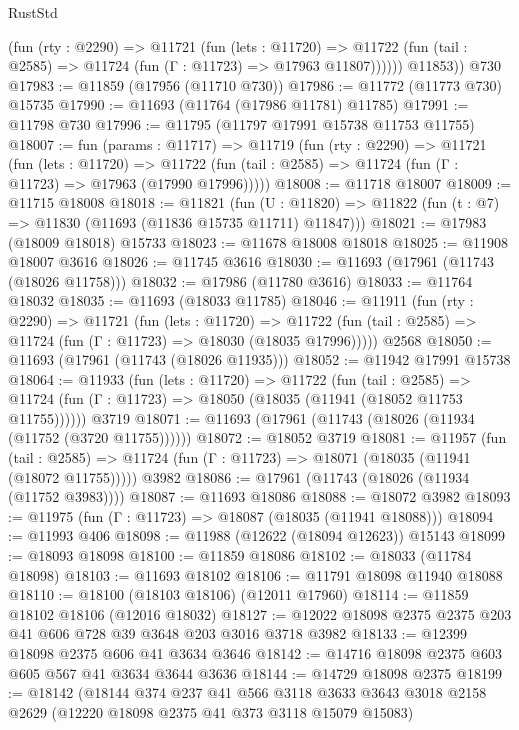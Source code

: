 \begin{lexlean}{RustStd}
\begin{coremodule}
            (fun (rty : @2290) =>
            @11721
              (fun (lets : @11720) =>
              @11722 (fun (tail : @2585) => @11724 (fun (Γ : @11723) => @17963 @11807))))))
        @11853))
    @730
@17983 := @11859 (@17956 (@11710 @730))
@17986 := @11772 (@11773 @730) @15735
@17990 := @11693 (@11764 (@17986 @11781) @11785)
@17991 := @11798 @730
@17996 := @11795 (@11797 @17991 @15738 @11753 @11755)
@18007 := fun (params : @11717) =>
  @11719
    (fun (rty : @2290) =>
    @11721
      (fun (lets : @11720) =>
      @11722 (fun (tail : @2585) => @11724 (fun (Γ : @11723) => @17963 (@17990 @17996)))))
@18008 := @11718 @18007
@18009 := @11715 @18008
@18018 := @11821
    (fun (U : @11820) => @11822 (fun (t : @7) => @11830 (@11693 (@11836 @15735 @11711) @11847)))
@18021 := @17983 (@18009 @18018) @15733
@18023 := @11678 @18008 @18018
@18025 := @11908 @18007 @3616
@18026 := @11745 @3616
@18030 := @11693 (@17961 (@11743 (@18026 @11758)))
@18032 := @17986 (@11780 @3616)
@18033 := @11764 @18032
@18035 := @11693 (@18033 @11785)
@18046 := @11911
    (fun (rty : @2290) =>
    @11721
      (fun (lets : @11720) =>
      @11722 (fun (tail : @2585) => @11724 (fun (Γ : @11723) => @18030 (@18035 @17996)))))
    @2568
@18050 := @11693 (@17961 (@11743 (@18026 @11935)))
@18052 := @11942 @17991 @15738
@18064 := @11933
    (fun (lets : @11720) =>
    @11722
      (fun (tail : @2585) =>
      @11724 (fun (Γ : @11723) => @18050 (@18035 (@11941 (@18052 @11753 @11755))))))
    @3719
@18071 := @11693 (@17961 (@11743 (@18026 (@11934 (@11752 (@3720 @11755))))))
@18072 := @18052 @3719
@18081 := @11957
    (fun (tail : @2585) => @11724 (fun (Γ : @11723) => @18071 (@18035 (@11941 (@18072 @11755)))))
    @3982
@18086 := @17961 (@11743 (@18026 (@11934 (@11752 @3983))))
@18087 := @11693 @18086
@18088 := @18072 @3982
@18093 := @11975 (fun (Γ : @11723) => @18087 (@18035 (@11941 @18088)))
@18094 := @11993 @406
@18098 := @11988 (@12622 (@18094 @12623)) @15143
@18099 := @18093 @18098
@18100 := @11859 @18086
@18102 := @18033 (@11784 @18098)
@18103 := @11693 @18102
@18106 := @11791 @18098 @11940 @18088
@18110 := @18100 (@18103 @18106) (@12011 @17960)
@18114 := @11859 @18102 @18106 (@12016 @18032)
@18127 := @12022 @18098 @2375 @2375 @203 @41 @606 @728 @39 @3648 @203 @3016 @3718 @3982
@18133 := @12399 @18098 @2375 @606 @41 @3634 @3646
@18142 := @14716 @18098 @2375 @603 @605 @567 @41 @3634 @3644 @3636
@18144 := @14729 @18098 @2375
@18199 := @18142
    (@18144
      @374
      @237
      @41
      @566
      @3118
      @3633
      @3643
      @3018
      @2158
      @2629
      (@12220 @18098 @2375 @41 @373 @3118 @15079 @15083)

\end{coremodule}
\end{lexlean}
